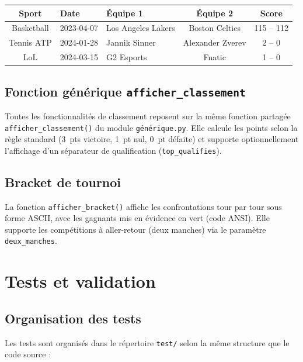 \documentclass[12pt,a4paper]{article}
\newcommand{\code}[1]{\texttt{#1}}
\newcommand{\fichier}[1]{\texttt{#1}}
\begin{document}
\begin{center}
\begin{tabular}{cllcc}
  \toprule
  \textbf{Sport} & \textbf{Date} & \textbf{Équipe 1} & \textbf{Équipe 2} & \textbf{Score} \\
  \midrule
  Basketball & 2023-04-07 & Los Angeles Lakers & Boston Celtics & 115 -- 112 \\
  Tennis ATP  & 2024-01-28 & Jannik Sinner & Alexander Zverev & 2 -- 0 \\
  LoL        & 2024-03-15 & G2 Esports & Fnatic & 1 -- 0 \\
  \bottomrule
\end{tabular}
\end{center}

\subsection{Fonction générique \code{afficher\_classement}}

Toutes les fonctionnalités de classement reposent sur la même fonction
partagée \code{afficher\_classement()} du module \fichier{générique.py}.
Elle calcule les points selon la règle standard (3~pts victoire, 1~pt nul,
0~pt défaite) et supporte optionnellement l'affichage d'un séparateur
de qualification (\code{top\_qualifies}).

\subsection{Bracket de tournoi}

La fonction \code{afficher\_bracket()} affiche les confrontations tour par tour
sous forme ASCII, avec les gagnants mis en évidence en vert (code ANSI).
Elle supporte les compétitions à aller-retour (deux manches) via le paramètre
\code{deux\_manches}.

\section{Tests et validation}
\label{sec:tests}

\subsection{Organisation des tests}

Les tests sont organisés dans le répertoire \fichier{test/} selon la même
structure que le code source :
\end{document}
